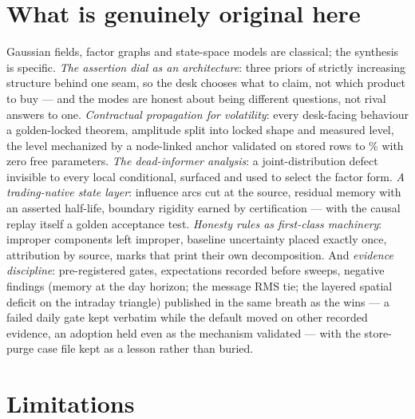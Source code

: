\documentclass[11pt]{article}
\begin{document}
\section{What is genuinely original here}
\label{sec:original}

Gaussian fields, factor graphs and state-space models are classical; the
synthesis is specific.  \emph{The assertion dial as an architecture}:
three priors of strictly increasing structure behind one seam, so the
desk chooses what to claim, not which product to buy --- and the modes
are honest about being different questions, not rival answers to one.
\emph{Contractual propagation for volatility}: every desk-facing
behaviour a golden-locked theorem, amplitude split into locked shape and
measured level, the level mechanized by a node-linked anchor validated on
stored rows to \gtppredgap\% with zero free parameters.  \emph{The
dead-informer analysis}: a joint-distribution defect invisible to every
local conditional, surfaced and used to select the factor form.  \emph{A
trading-native state layer}: influence arcs cut at the source, residual
memory with an asserted half-life, boundary rigidity earned by
certification --- with the causal replay itself a golden acceptance test.
\emph{Honesty rules as first-class machinery}: improper components left
improper, baseline uncertainty placed exactly once, attribution by
source, marks that print their own decomposition.  And \emph{evidence
discipline}: pre-registered gates, expectations recorded before sweeps,
negative findings (memory at the day horizon; the message RMS tie; the
layered spatial deficit on the intraday triangle) published in the same
breath as the wins --- a failed daily gate kept verbatim while the
default moved on other recorded evidence, an adoption held even as the
mechanism validated --- with the store-purge case
file kept as a lesson rather than buried.

\section{Limitations}
\label{sec:limits}
\end{document}
